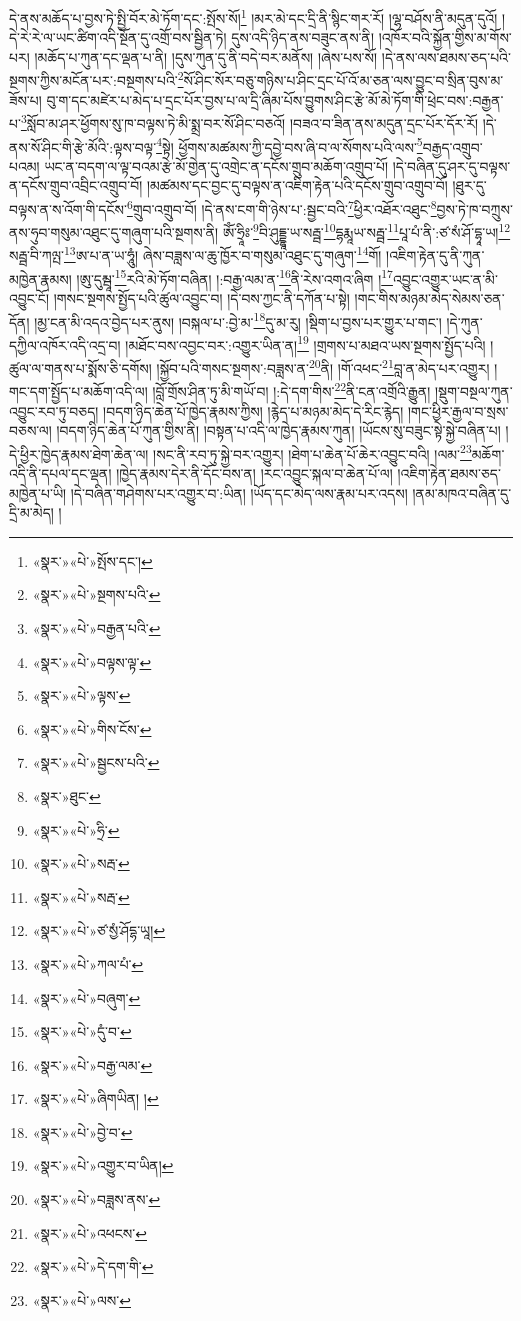 དེ་ནས་མཆོད་པ་བྱས་ཏེ་སྤྱི་བོར་མེ་ཏོག་དང་:སྤོས་སོ།\footnote{«སྣར་»«པེ་»སྤོས་དང་།} །མར་མེ་དང་དྲི་ནི་སྙིང་གར་རོ། །ལྷ་བཤོས་ནི་མདུན་དུའོ། །དེ་རེ་རེ་ལ་ཡང་ཚིག་འདི་སྔོན་དུ་འགྲོ་བས་སྦྱིན་ཏེ། དུས་འདི་ཉིད་ནས་བཟུང་ནས་ནི། །འཁོར་བའི་སྐྱོན་གྱིས་མ་གོས་པར། །མཆོད་པ་ཀུན་དང་ལྡན་པ་ནི། །དུས་ཀུན་དུ་ནི་བདེ་བར་མནོས། །ཞེས་པས་སོ། །དེ་ནས་ལས་ཐམས་ཅད་པའི་སྔགས་ཀྱིས་མངོན་པར་:བསྔགས་པའི་\footnote{«སྣར་»«པེ་»སྔགས་པའི་}སོ་ཤིང་སོར་བཅུ་གཉིས་པ་ཤིང་དྲང་པོ་འོ་མ་ཅན་ལས་བྱུང་བ་སྲིན་བུས་མ་ཟོས་པ། བུ་ག་དང་མཛེར་པ་མེད་པ་དྲང་པོར་བྱས་པ་ལ་དྲི་ཞིམ་པོས་བྱུགས་ཤིང་རྩེ་མོ་མེ་ཏོག་གི་ཕྲེང་བས་:བརྒྱན་པ་\footnote{«སྣར་»«པེ་»བརྒྱན་པའི་}སློབ་མ་ཤར་ཕྱོགས་སུ་ཁ་བལྟས་ཏེ་མི་སྨྲ་བར་སོ་ཤིང་བཅའོ། །བཟའ་བ་ཟིན་ནས་མདུན་དྲང་པོར་དོར་རོ། །དེ་ནས་སོ་ཤིང་གི་རྩེ་མོའི་:ལྟས་བལྟ་\footnote{«སྣར་»«པེ་»བལྟས་ལྟ་}སྟེ། ཕྱོགས་མཚམས་ཀྱི་དབྱེ་བས་ཞི་བ་ལ་སོགས་པའི་ལས་\footnote{«སྣར་»«པེ་»ལྟས་}བརྒྱད་འགྲུབ་པའམ། ཡང་ན་བདག་ལ་ལྟ་བའམ་རྩེ་མོ་གྱེན་དུ་འགྲེང་ན་དངོས་གྲུབ་མཆོག་འགྲུབ་པོ། །དེ་བཞིན་དུ་ཤར་དུ་བལྟས་ན་དངོས་གྲུབ་འབྲིང་འགྲུབ་བོ། །མཚམས་དང་བྱང་དུ་བལྟས་ན་འཇིག་རྟེན་པའི་དངོས་གྲུབ་འགྲུབ་བོ། །ཐུར་དུ་བལྟས་ན་ས་འོག་གི་དངོས་\footnote{«སྣར་»«པེ་»གིས་ངོས་}གྲུབ་འགྲུབ་བོ། །དེ་ནས་ངག་གི་ཉེས་པ་:སྦྱང་བའི་\footnote{«སྣར་»«པེ་»སྦྱངས་པའི་}ཕྱིར་འཐོར་འཐུང་\footnote{«སྣར་»ཐུང་}བྱས་ཏེ་ཁ་བཀྲུས་ནས་ཧུབ་གསུམ་འཐུང་དུ་གཞུག་པའི་སྔགས་ནི། ཨོཾ་ཧྲཱིཿ་\footnote{«སྣར་»«པེ་»ཧྲི་}བི་ཤུདྡྷཱ་ཡ་སརྦྦ་\footnote{«སྣར་»«པེ་»སརྦ་}དྷརྨཱཡ་སརྦྦ་\footnote{«སྣར་»«པེ་»སརྦ་}པཱ་པཾ་ནི་:ཙ་སཾ་ཤོ་དྷཱ་ཡ།\footnote{«སྣར་»«པེ་»ཙ་སྱཾ་ཤོདྷ་ཡཱ།} སརྦྦ་བི་ཀལྤ་\footnote{«སྣར་»«པེ་»ཀལ་པཾ་}ཨ་པ་ན་ཡ་ཧཱུཾ། ཞེས་བཟླས་ལ་ཆུ་ཁྱོར་བ་གསུམ་འཐུང་དུ་གཞུག་\footnote{«སྣར་»«པེ་»བཞུག་}གོ། །འཇིག་རྟེན་དུ་ནི་ཀུན་མཁྱེན་རྣམས། །ཨུ་དུམྦཱ་\footnote{«སྣར་»«པེ་»དུཾ་བ་}རའི་མེ་ཏོག་བཞིན། །:བརྒྱ་ལམ་ན་\footnote{«སྣར་»«པེ་»བརྒྱ་ལམ་}ནི་རེས་འགའ་ཞིག །\footnote{«སྣར་»«པེ་»ཞིགཡིན། །}འབྱུང་འགྱུར་ཡང་ན་མི་འབྱུང་ངོ། །གསང་སྔགས་སྤྱོད་པའི་ཚུལ་འབྱུང་བ། །དེ་བས་ཀྱང་ནི་དཀོན་པ་སྟེ། །གང་གིས་མཉམ་མེད་སེམས་ཅན་དོན། །མྱ་ངན་མི་འདའ་བྱེད་པར་ནུས། །བསྐལ་པ་:བྱེ་མ་\footnote{«སྣར་»«པེ་»བྱེ་བ་}དུ་མ་རུ། །སྡིག་པ་བྱས་པར་གྱུར་པ་གང་། །དེ་ཀུན་དཀྱིལ་འཁོར་འདི་འདྲ་བ། །མཐོང་བས་འབྱང་བར་:འགྱུར་ཡིན་ན།\footnote{«སྣར་»«པེ་»འགྱུར་བ་ཡིན།} །གྲགས་པ་མཐའ་ཡས་སྔགས་སྤྱོད་པའི། །ཚུལ་ལ་གནས་པ་སྨོས་ཅི་དགོས། །སྐྱོབ་པའི་གསང་སྔགས་:བཟླས་ན་\footnote{«སྣར་»«པེ་»བཟླས་ནས་}ནི། །གོ་འཕང་\footnote{«སྣར་»«པེ་»འཕངས་}བླ་ན་མེད་པར་འགྱུར། །གང་དག་སྤྱོད་པ་མཆོག་འདི་ལ། །བློ་གྲོས་ཤིན་ཏུ་མི་གཡོ་བ། །:དེ་དག་གིས་\footnote{«སྣར་»«པེ་»དེ་དག་གི་}ནི་ངན་འགྲོའི་རྒྱུན། །སྡུག་བསྔལ་ཀུན་འབྱུང་རབ་ཏུ་བཅད། །བདག་ཉིད་ཆེན་པོ་ཁྱེད་རྣམས་ཀྱིས། །རྙེད་པ་མཉམ་མེད་དེ་རིང་རྙེད། །གང་ཕྱིར་རྒྱལ་བ་སྲས་བཅས་ལ། །བདག་ཉིད་ཆེན་པོ་ཀུན་གྱིས་ནི། །བསྟན་པ་འདི་ལ་ཁྱེད་རྣམས་ཀུན། །ཡོངས་སུ་བཟུང་སྟེ་སྐྱེ་བཞིན་པ། །དེ་ཕྱིར་ཁྱེད་རྣམས་ཐེག་ཆེན་ལ། །སང་ནི་རབ་ཏུ་སྐྱེ་བར་འགྱུར། །ཐེག་པ་ཆེན་པོ་ཆེར་འབྱུང་བའི། །ལམ་\footnote{«སྣར་»«པེ་»ལས་}མཆོག་འདི་ནི་དཔལ་དང་ལྡན། །ཁྱེད་རྣམས་དེར་ནི་དོང་བས་ན། །རང་འབྱུང་སྐལ་བ་ཆེན་པོ་ལ། །འཇིག་རྟེན་ཐམས་ཅད་མཁྱེན་པ་ཡི། །དེ་བཞིན་གཤེགས་པར་འགྱུར་བ་:ཡིན། །ཡོད་དང་མེད་ལས་རྣམ་པར་འདས། །ནམ་མཁའ་བཞིན་དུ་དྲི་མ་མེད། །
